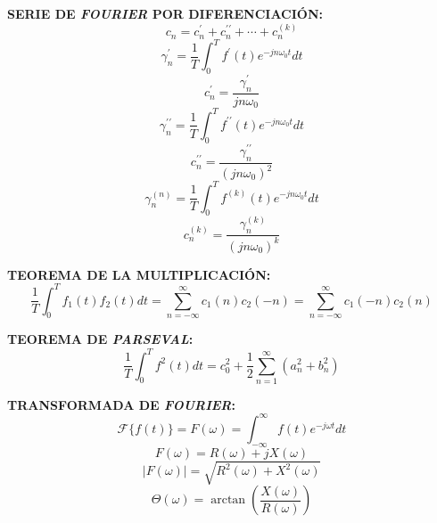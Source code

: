 \documentclass[letter,twoside,8pt]{article}
\begin{document}
\textbf{SERIE DE \emph{FOURIER} POR DIFERENCIACIÓN:}
\begin{equation*}
    c_n=c^\prime_n+c^{\prime\prime}_n+\cdots+c^{(k)}_n
\end{equation*}
\begin{equation*}
    \gamma^\prime_n=\frac{1}{T}\int_0^{T}f^{\prime}(t)e^{-jn{\omega_0}t}{dt}
\end{equation*}
\begin{equation*}
    c^\prime_n=\frac{\gamma^\prime_n}{jn\omega_0}
\end{equation*}
\begin{equation*}
    \gamma^{\prime\prime}_n=\frac{1}{T}\int_0^{T}f^{\prime\prime}(t)e^{-jn{\omega_0}t}{dt}
\end{equation*}
\begin{equation*}
    c^{\prime\prime}_n=\frac{\gamma^{\prime\prime}_n}{{(jn\omega_0)}^2}
\end{equation*}
\begin{equation*}
    \gamma^{(n)}_n=\frac{1}{T}\int_0^{T}f^{(k)}(t)e^{-jn{\omega_0}t}{dt}
\end{equation*}
\begin{equation*}
    c^{(k)}_n=\frac{\gamma^{(k)}_n}{{(jn\omega_0)}^k}
\end{equation*}

\textbf{TEOREMA DE LA MULTIPLICACIÓN:}
\begin{equation*}
    \frac{1}{T}\int_0^{T}f_1(t)f_2(t){dt}=\sum_{n={-\infty}}^{\infty}{c_1}(n){c_2}(-n)=\sum_{n={-\infty}}^{\infty}{c_1}(-n){c_2}(n)
\end{equation*}

\textbf{TEOREMA DE \emph{PARSEVAL}:}
\begin{equation*}
    \frac{1}{T}\int_0^{T}f^2(t){dt}=c_0^2+\frac{1}{2}\sum_{n=1}^{\infty}(a_n^2+b_n^2)
\end{equation*}

\textbf{TRANSFORMADA DE \emph{FOURIER}:}
\begin{equation*}
    \mathcal{F}\{f(t)\}=F(\omega)=\int_{-\infty}^{\infty}f(t)e^{-j{\omega}t}{dt}
\end{equation*}
\begin{equation*}
    F(\omega)=R(\omega)+jX(\omega)
\end{equation*}
\begin{equation*}
    |F(\omega)|=\sqrt{R^2(\omega)+X^2(\omega)}
\end{equation*}
\begin{equation*}
    \Theta(\omega)=\arctan\left(\frac{X(\omega)}{R(\omega)}\right)
\end{equation*}
\end{document}
